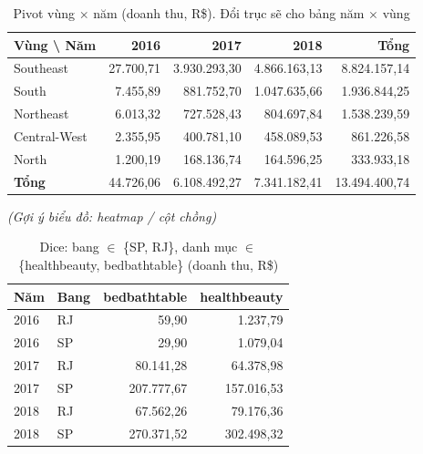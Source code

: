 \documentclass[12pt,a4paper]{report}
\newcommand{\bieudo}[1]{\par{\small\textit{(Gợi ý biểu đồ: #1)}}\par}
\renewcommand{\_}{\oldunderscore\allowbreak}
\begin{document}
\begin{table}[H]
\centering\small
\caption{Pivot vùng $\times$ năm (doanh thu, R\$). Đổi trục sẽ cho bảng năm $\times$ vùng}
\begin{tabular}{lrrrr}
\toprule
Vùng \textbackslash{} Năm & 2016 & 2017 & 2018 & Tổng \\
\midrule
Southeast & 27.700,71 & 3.930.293,30 & 4.866.163,13 & 8.824.157,14 \\
South & 7.455,89 & 881.752,70 & 1.047.635,66 & 1.936.844,25 \\
Northeast & 6.013,32 & 727.528,43 & 804.697,84 & 1.538.239,59 \\
Central-West & 2.355,95 & 400.781,10 & 458.089,53 & 861.226,58 \\
North & 1.200,19 & 168.136,74 & 164.596,25 & 333.933,18 \\
\midrule
\textbf{Tổng} & 44.726,06 & 6.108.492,27 & 7.341.182,41 & 13.494.400,74 \\
\bottomrule
\end{tabular}
\end{table}
\bieudo{heatmap / cột chồng}

\begin{table}[H]
\centering\small
\caption{Dice: bang $\in$ \{SP, RJ\}, danh mục $\in$ \{health\_beauty, bed\_bath\_table\} (doanh thu, R\$)}
\begin{tabular}{llrr}
\toprule
Năm & Bang & bed\_bath\_table & health\_beauty \\
\midrule
2016 & RJ & 59,90 & 1.237,79 \\
2016 & SP & 29,90 & 1.079,04 \\
2017 & RJ & 80.141,28 & 64.378,98 \\
2017 & SP & 207.777,67 & 157.016,53 \\
2018 & RJ & 67.562,26 & 79.176,36 \\
2018 & SP & 270.371,52 & 302.498,32 \\
\bottomrule
\end{tabular}
\end{table}
\end{document}
